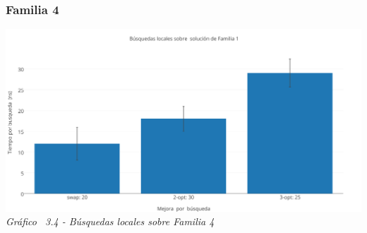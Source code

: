 \subsubsection*{Familia 4}

\vspace*{0.3cm} \vspace*{0.3cm}
  \begin{center}
 \includegraphics[scale=0.5]{./EJ3/local_search_familia.png}
 {            \textit{Gráfico \ 3.4 - Búsquedas locales sobre Familia 4}}
  \end{center}
  \vspace*{0.3cm}
